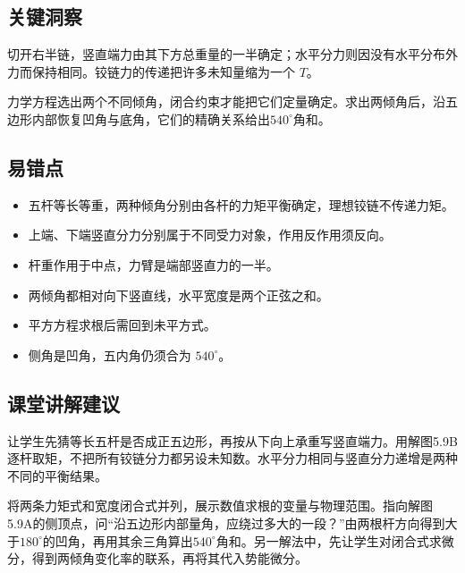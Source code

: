 \documentclass[UTF8,fontset=fandol,a4paper,11pt]{ctexart}
\begin{document}


\subsection*{关键洞察}

切开右半链，竖直端力由其下方总重量的一半确定；水平分力则因没有水平分布外力而保持相同。铰链力的传递把许多未知量缩为一个 $T$。

力学方程选出两个不同倾角，闭合约束才能把它们定量确定。求出两倾角后，沿五边形内部恢复凹角与底角，它们的精确关系给出$540^\circ$角和。



\subsection*{易错点}

\begin{itemize}\item 五杆等长等重，两种倾角分别由各杆的力矩平衡确定，理想铰链不传递力矩。\item 上端、下端竖直分力分别属于不同受力对象，作用反作用须反向。\item 杆重作用于中点，力臂是端部竖直力的一半。\item 两倾角都相对向下竖直线，水平宽度是两个正弦之和。\item 平方方程求根后需回到未平方式。\item 侧角是凹角，五内角仍须合为 $540^\circ$。\end{itemize}



\subsection*{课堂讲解建议}

让学生先猜等长五杆是否成正五边形，再按从下向上承重写竖直端力。用解图5.9B逐杆取矩，不把所有铰链分力都另设未知数。水平分力相同与竖直分力递增是两种不同的平衡结果。

将两条力矩式和宽度闭合式并列，展示数值求根的变量与物理范围。指向解图5.9A的侧顶点，问“沿五边形内部量角，应绕过多大的一段？”由两根杆方向得到大于$180^\circ$的凹角，再用其余三角算出$540^\circ$角和。另一解法中，先让学生对闭合式求微分，得到两倾角变化率的联系，再将其代入势能微分。
\end{document}
